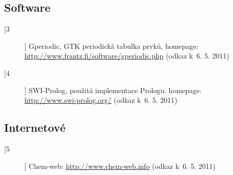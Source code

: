 \documentclass{article}
\begin{document}
\subsection{Software}
\begin{description}
\item[[3]] Gperiodic, GTK periodická tabulka prvků, homepage:\\
\hyperlink{http://www.frantz.fi/software/gperiodic.php}{http://www.frantz.fi/software/gperiodic.php} (odkaz k~6. 5. 2011)
\item[[4]] SWI-Prolog, použitá implementace Prologu, homepage:\\
\hyperlink{http://www.swi-prolog.org/}{http://www.swi-prolog.org/} (odkaz k~6. 5. 2011)
\end{description}
\subsection[Internetové]{Internetové}
\begin{description}
\item[[5]] Chem-web: \hyperlink{http://www.chem-web.info}{http://www.chem-web.info} (odkaz k~6. 5. 2011)
\end{description}
\end{document}
